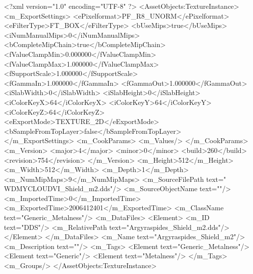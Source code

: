 <?xml version="1.0" encoding="UTF-8" ?>
<AssetObjects:TextureInstance>
	<m_ExportSettings>
		<ePixelformat>PF_R8_UNORM</ePixelformat>
		<eFilterType>FT_BOX</eFilterType>
		<bUseMips>true</bUseMips>
		<iNumManualMips>0</iNumManualMips>
		<bCompleteMipChain>true</bCompleteMipChain>
		<fValueClampMin>0.000000</fValueClampMin>
		<fValueClampMax>1.000000</fValueClampMax>
		<fSupportScale>1.000000</fSupportScale>
		<fGammaIn>1.000000</fGammaIn>
		<fGammaOut>1.000000</fGammaOut>
		<iSlabWidth>0</iSlabWidth>
		<iSlabHeight>0</iSlabHeight>
		<iColorKeyX>64</iColorKeyX>
		<iColorKeyY>64</iColorKeyY>
		<iColorKeyZ>64</iColorKeyZ>
		<eExportMode>TEXTURE_2D</eExportMode>
		<bSampleFromTopLayer>false</bSampleFromTopLayer>
	</m_ExportSettings>
	<m_CookParams>
		<m_Values/>
	</m_CookParams>
	<m_Version>
		<major>4</major>
		<minor>0</minor>
		<build>260</build>
		<revision>754</revision>
	</m_Version>
	<m_Height>512</m_Height>
	<m_Width>512</m_Width>
	<m_Depth>1</m_Depth>
	<m_NumMipMaps>9</m_NumMipMaps>
	<m_SourceFilePath text="\\WDMYCLOUD\Sam\Projects\Modding\Civ VI\Civilizations\Seleucid\Textures\Argyraspides_Shield_m2.dds"/>
	<m_SourceObjectName text=""/>
	<m_ImportedTime>0</m_ImportedTime>
	<m_ExportedTime>2006412401</m_ExportedTime>
	<m_ClassName text="Generic_Metalness"/>
	<m_DataFiles>
		<Element>
			<m_ID text="DDS"/>
			<m_RelativePath text="Argyraspides_Shield_m2.dds"/>
		</Element>
	</m_DataFiles>
	<m_Name text="Argyraspides_Shield_m2"/>
	<m_Description text=""/>
	<m_Tags>
		<Element text="Generic_Metalness"/>
		<Element text="Generic"/>
		<Element text="Metalness"/>
	</m_Tags>
	<m_Groups/>
</AssetObjects:TextureInstance>

 